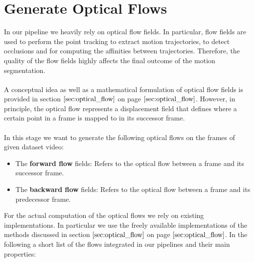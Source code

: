 \section{Generate Optical Flows}
\label{sec:generate_of}
In our pipeline we heavily rely on optical flow fields. In particular, flow fields are used to perform the point tracking to extract motion trajectories, to detect occlusions and for computing the affinities between trajectories. Therefore, the quality of the flow fields highly affects the final outcome of the motion segmentation. \\ \\
A conceptual idea as well as a mathematical formulation of optical flow fields is provided in section $\ref{sec:optical_flow}$ on page $\pageref{sec:optical_flow}$. However, in principle, the optical flow represents a displacement field that defines where a certain point in a frame is mapped to in its successor frame. \\ \\
In this stage we want to generate the following optical flows on the frames of given dataset video:
\begin{itemize}
	\item The \textbf{forward flow} fields: Refers to the optical flow between a frame and its successor frame.
	\item The \textbf{backward flow} fields: Refers to the optical flow between a frame and its predecessor frame.
\end{itemize}
For the actual computation of the optical flows we rely on existing implementations. In particular we use the freely available implementations of the methods discussed in section $\ref{sec:optical_flow}$ on page $\pageref{sec:optical_flow}$. In the following a short list of the flows integrated in our pipelines and their main properties:
